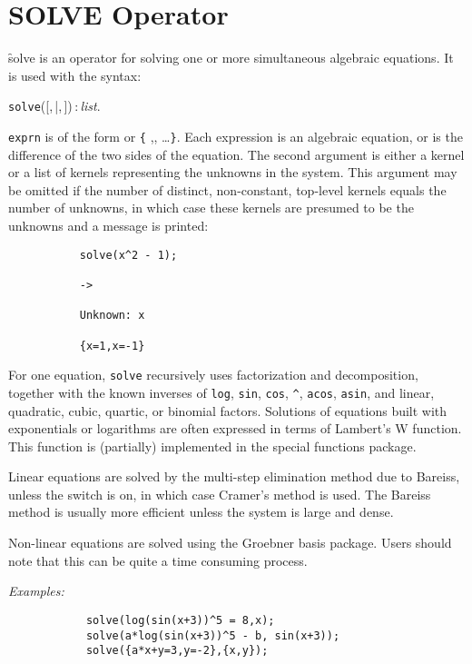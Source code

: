 \section{SOLVE Operator}
\hypertarget{operator:SOLVE}{}
\f{solve} is an operator for solving one or more simultaneous algebraic
equations. It is used with the syntax:
\begin{syntax}
  \texttt{solve}([,\,|,\,])\,:\,\textit{list}.
\end{syntax}
\texttt{exprn} is of the form  or
\texttt{\{} ,, \dots \texttt{\}}.
Each expression is an
algebraic equation, or is the difference of the two sides of the equation.
The second argument is either a kernel or a list of kernels representing
the unknowns in the system.  This argument may be omitted if the number of
distinct, non-constant, top-level kernels equals the number of unknowns,
in which case these kernels are presumed to be the unknowns and a message is
printed:
\begin{verbatim}
           solve(x^2 - 1);

           ->

           Unknown: x

           {x=1,x=-1}
\end{verbatim}
For one equation, \texttt{solve} recursively uses
factorization and decomposition, together with the known inverses of
\texttt{log}, \texttt{sin}, \texttt{cos}, \texttt{\textasciicircum},
\texttt{acos}, \texttt{asin}, and
linear, quadratic, cubic, quartic, or binomial factors. Solutions
of equations built with exponentials or logarithms are often
expressed in terms of Lambert's W function.
This function is (partially) implemented in the special functions package.

Linear equations are solved by the multi-step elimination method due to
Bareiss, unless the switch  is on, in which
case Cramer's method is used.  The Bareiss method is usually more
efficient unless the system is large and dense.

Non-linear equations are solved using the Groebner basis
package.
Users should note that this
can be quite a time consuming process.

\textit{Examples:}
\begin{verbatim}
            solve(log(sin(x+3))^5 = 8,x);
            solve(a*log(sin(x+3))^5 - b, sin(x+3));
            solve({a*x+y=3,y=-2},{x,y});
\end{verbatim}

